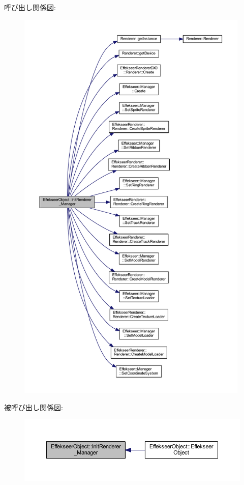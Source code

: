 呼び出し関係図\+:
\nopagebreak
\begin{figure}[H]
\begin{center}
\leavevmode
\includegraphics[height=550pt]{class_effekseer_object_a4f8e7ad6b6ebfa341302f6b78e846f1e_cgraph}
\end{center}
\end{figure}
被呼び出し関係図\+:\nopagebreak
\begin{figure}[H]
\begin{center}
\leavevmode
\includegraphics[width=350pt]{class_effekseer_object_a4f8e7ad6b6ebfa341302f6b78e846f1e_icgraph}
\end{center}
\end{figure}
\mbox{\label{class_effekseer_object_a1566339dd4acebff341a867a2fd05c17}} 
